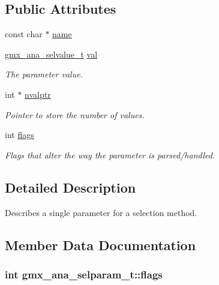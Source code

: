 \subsection*{\-Public \-Attributes}
\begin{DoxyCompactItemize}
\item 
const char $\ast$ \hyperlink{structgmx__ana__selparam__t_ad1426fc1afc601e3212493a6cb00ea4d}{name}
\item 
\hyperlink{structgmx__ana__selvalue__t}{gmx\-\_\-ana\-\_\-selvalue\-\_\-t} \hyperlink{structgmx__ana__selparam__t_a1a2ccba901e24c9c8e2c00c2b61b24d2}{val}
\begin{DoxyCompactList}\small\item\em \-The parameter value. \end{DoxyCompactList}\item 
int $\ast$ \hyperlink{structgmx__ana__selparam__t_a727a1b2415611c5506aa763f0256b76d}{nvalptr}
\begin{DoxyCompactList}\small\item\em \-Pointer to store the number of values. \end{DoxyCompactList}\item 
int \hyperlink{structgmx__ana__selparam__t_a930d49c12a78b6824e4793179b37bc02}{flags}
\begin{DoxyCompactList}\small\item\em \-Flags that alter the way the parameter is parsed/handled. \end{DoxyCompactList}\end{DoxyCompactItemize}


\subsection{\-Detailed \-Description}
\-Describes a single parameter for a selection method. 

\subsection{\-Member \-Data \-Documentation}
\hypertarget{structgmx__ana__selparam__t_a930d49c12a78b6824e4793179b37bc02}{
\subsubsection[{flags}]{\setlength{\rightskip}{0pt plus 5cm}int {\bf gmx\-\_\-ana\-\_\-selparam\-\_\-t\-::flags}}}\label{structgmx__ana__selparam__t_a930d49c12a78b6824e4793179b37bc02}


